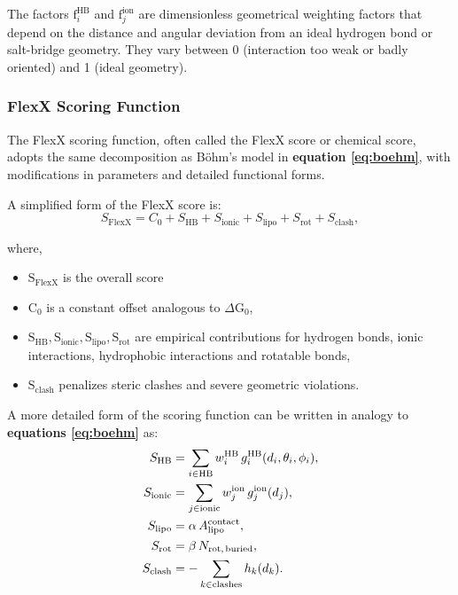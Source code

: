 \documentclass[12pt]{article}
\begin{document}
The factors $\textrm{f}_i^{\textrm{HB}}$ and $\textrm{f}_j^{\textrm{ion}}$ are dimensionless geometrical weighting factors that depend on the distance and angular deviation from an ideal hydrogen bond or salt-bridge geometry. They vary between 0 (interaction too weak or badly oriented) and 1 (ideal geometry).

\subsubsection{FlexX Scoring Function}
The FlexX scoring function, often called the FlexX score or chemical score, adopts the same decomposition as B{\"o}hm's model in \textbf{equation \ref{eq:boehm}}, with modifications in parameters and detailed functional forms\cite{CH7_rarey1996,CH7_stahl,CH7_aiscore2008}.

A simplified form of the FlexX score is:
\begin{equation}
  S_{\text{FlexX}}
  =
  C_0
  +
  S_{\text{HB}}
  +
  S_{\text{ionic}}
  +
  S_{\text{lipo}}
  +
  S_{\text{rot}}
  +
  S_{\text{clash}},
  \label{eq:flexx_general}
\end{equation}

where,
\begin{itemize}
  \item $\textrm{S}_{\textrm{FlexX}}$ is the overall score
  \item $\textrm{C}_0$ is a constant offset analogous to $\Delta\textrm{G}_0$,
  \item $\textrm{S}_{\textrm{HB}}, \textrm{S}_{\textrm{ionic}}, \textrm{S}_{\textrm{lipo}}, \textrm{S}_{\textrm{rot}}$ are empirical contributions for hydrogen bonds, ionic interactions, hydrophobic interactions and rotatable bonds,
  \item $\textrm{S}_{\textrm{clash}}$ penalizes steric clashes and severe geometric violations.
\end{itemize}

A more detailed form of the scoring function can be written in analogy to
\textbf{equations \ref{eq:boehm}} as:
\begin{equation}
\begin{aligned}
  S_{\text{HB}}
  &=
  \sum_{i \in \text{HB}}
  w_i^{\text{HB}} \,
  g_i^{\text{HB}}(d_i, \theta_i, \phi_i),
  \\
  S_{\text{ionic}}
  &=
  \sum_{j \in \text{ionic}}
  w_j^{\text{ion}} \,
  g_j^{\text{ion}}(d_j),
  \\
  S_{\text{lipo}}
  &=
  \alpha \,
  A_{\text{lipo}}^{\text{contact}},
  \\
  S_{\text{rot}}
  &=
  \beta \,
  N_{\text{rot,\,buried}},
  \\
  S_{\text{clash}}
  &=
  - \sum_{k \in \text{clashes}}
  h_k(d_k).
\end{aligned}
  \label{eq:flexx}
\end{equation}
\end{document}
